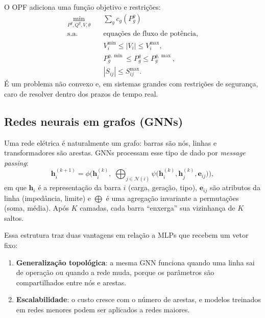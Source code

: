 \documentclass[11pt,a4paper]{article}
\begin{document}
O OPF adiciona uma função objetivo e restrições:
\begin{equation}
\begin{aligned}
  \min_{P^g, Q^g, V, \theta} \quad & \sum_{g} c_g(P^g_g) \\
  \text{s.a.} \quad & \text{equações de fluxo de potência}, \\
  & V_i^{\min} \le |V_i| \le V_i^{\max}, \\
  & P^{g,\min}_g \le P^g_g \le P^{g,\max}_g, \\
  & |S_{ij}| \le S_{ij}^{\max}.
\end{aligned}
\end{equation}
É um problema não convexo e, em sistemas grandes com restrições de
segurança, caro de resolver dentro dos prazos de tempo real.

\subsection{Redes neurais em grafos (GNNs)}

Uma rede elétrica é naturalmente um grafo: barras são nós, linhas e
transformadores são arestas. GNNs processam esse tipo de dado por
\textit{message passing}:
\begin{equation}
  \mathbf{h}_i^{(k+1)} = \phi\Big(\mathbf{h}_i^{(k)},\;
  \bigoplus_{j \in \mathcal{N}(i)} \psi\big(\mathbf{h}_i^{(k)}, \mathbf{h}_j^{(k)}, \mathbf{e}_{ij}\big)\Big),
\end{equation}
em que $\mathbf{h}_i$ é a representação da barra $i$ (carga, geração, tipo),
$\mathbf{e}_{ij}$ são atributos da linha (impedância, limite) e $\bigoplus$ é
uma agregação invariante a permutações (soma, média). Após $K$ camadas, cada
barra ``enxerga'' sua vizinhança de $K$ saltos.

Essa estrutura traz duas vantagens em relação a MLPs que recebem um vetor
fixo:
\begin{enumerate}
  \item \textbf{Generalização topológica}: a mesma GNN funciona quando uma
    linha sai de operação ou quando a rede muda, porque os parâmetros são
    compartilhados entre nós e arestas.
  \item \textbf{Escalabilidade}: o custo cresce com o número de arestas, e
    modelos treinados em redes menores podem ser aplicados a redes maiores.
\end{enumerate}
\end{document}
